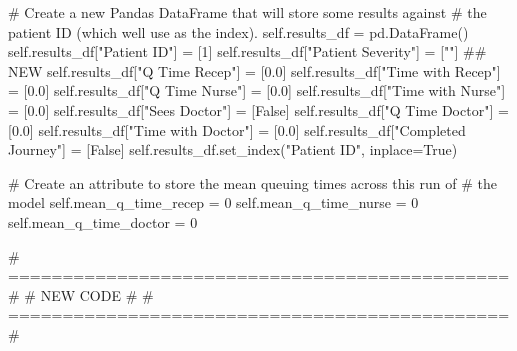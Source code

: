 \documentclass[
  letterpaper,
  DIV=11,
  numbers=noendperiod]{scrreprt}
\newenvironment{Shaded}{}{}
\newcommand{\CommentTok}[1]{\textcolor[rgb]{0.42,0.45,0.49}{#1}}
\newcommand{\DecValTok}[1]{\textcolor[rgb]{0.00,0.36,0.77}{#1}}
\newcommand{\FloatTok}[1]{\textcolor[rgb]{0.00,0.36,0.77}{#1}}
\newcommand{\NormalTok}[1]{\textcolor[rgb]{0.14,0.16,0.18}{#1}}
\newcommand{\OperatorTok}[1]{\textcolor[rgb]{0.14,0.16,0.18}{#1}}
\newcommand{\StringTok}[1]{\textcolor[rgb]{0.01,0.18,0.38}{#1}}
\newcommand{\VariableTok}[1]{\textcolor[rgb]{0.89,0.38,0.04}{#1}}
\newcommand*\circled[1]{\tikz[baseline=(char.base)]{
          \node[shape=circle,draw,inner sep=1pt] (char) {{\scriptsize#1}};}}
\begin{document}
\begin{Shaded}
\begin{Highlighting}[]
        \CommentTok{\# Create a new Pandas DataFrame that will store some results against}
        \CommentTok{\# the patient ID (which we\textquotesingle{}ll use as the index).}
        \VariableTok{self}\NormalTok{.results\_df }\OperatorTok{=}\NormalTok{ pd.DataFrame()}
        \VariableTok{self}\NormalTok{.results\_df[}\StringTok{"Patient ID"}\NormalTok{] }\OperatorTok{=}\NormalTok{ [}\DecValTok{1}\NormalTok{]}
        \VariableTok{self}\NormalTok{.results\_df[}\StringTok{"Patient Severity"}\NormalTok{] }\OperatorTok{=}\NormalTok{ [}\StringTok{""}\NormalTok{] }\CommentTok{\#\# NEW }\hspace*{\fill}\NormalTok{\circled{1}}
        \VariableTok{self}\NormalTok{.results\_df[}\StringTok{"Q Time Recep"}\NormalTok{] }\OperatorTok{=}\NormalTok{ [}\FloatTok{0.0}\NormalTok{]}
        \VariableTok{self}\NormalTok{.results\_df[}\StringTok{"Time with Recep"}\NormalTok{] }\OperatorTok{=}\NormalTok{ [}\FloatTok{0.0}\NormalTok{]}
        \VariableTok{self}\NormalTok{.results\_df[}\StringTok{"Q Time Nurse"}\NormalTok{] }\OperatorTok{=}\NormalTok{ [}\FloatTok{0.0}\NormalTok{]}
        \VariableTok{self}\NormalTok{.results\_df[}\StringTok{"Time with Nurse"}\NormalTok{] }\OperatorTok{=}\NormalTok{ [}\FloatTok{0.0}\NormalTok{]}
        \VariableTok{self}\NormalTok{.results\_df[}\StringTok{"Sees Doctor"}\NormalTok{] }\OperatorTok{=}\NormalTok{ [}\VariableTok{False}\NormalTok{]}
        \VariableTok{self}\NormalTok{.results\_df[}\StringTok{"Q Time Doctor"}\NormalTok{] }\OperatorTok{=}\NormalTok{ [}\FloatTok{0.0}\NormalTok{]}
        \VariableTok{self}\NormalTok{.results\_df[}\StringTok{"Time with Doctor"}\NormalTok{] }\OperatorTok{=}\NormalTok{ [}\FloatTok{0.0}\NormalTok{]}
        \VariableTok{self}\NormalTok{.results\_df[}\StringTok{"Completed Journey"}\NormalTok{] }\OperatorTok{=}\NormalTok{ [}\VariableTok{False}\NormalTok{]}
        \VariableTok{self}\NormalTok{.results\_df.set\_index(}\StringTok{"Patient ID"}\NormalTok{, inplace}\OperatorTok{=}\VariableTok{True}\NormalTok{)}

        \CommentTok{\# Create an attribute to store the mean queuing times across this run of}
        \CommentTok{\# the model}
        \VariableTok{self}\NormalTok{.mean\_q\_time\_recep }\OperatorTok{=} \DecValTok{0}
        \VariableTok{self}\NormalTok{.mean\_q\_time\_nurse }\OperatorTok{=} \DecValTok{0}
        \VariableTok{self}\NormalTok{.mean\_q\_time\_doctor }\OperatorTok{=} \DecValTok{0}

        \CommentTok{\# ============================================== \#}
        \CommentTok{\# NEW CODE                                       \#}
        \CommentTok{\# ============================================== \#}


\end{Highlighting}
\end{Shaded}
\end{document}
